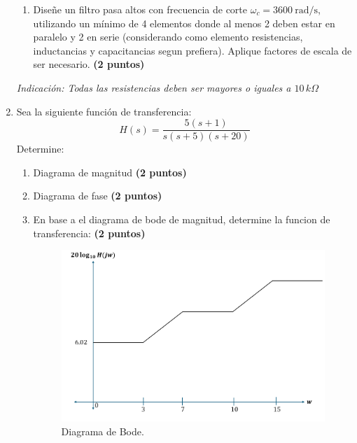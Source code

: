 \documentclass[
	spanish, %
	letterpaper, oneside
]{article}
\begin{document}
\begin{enumerate}
\begin{enumerate}[label=(\alph*)]
        \item Diseñe un filtro pasa altos con frecuencia de corte $\omega_c = 3600~\text{rad/s}$, utilizando un mínimo de 4 elementos donde al menos 2 deben estar en paralelo y 2 en serie (considerando como elemento resistencias, inductancias y capacitancias segun prefiera). Aplique factores de escala de ser necesario. \textbf{(2 puntos)}

    \end{enumerate}

    \textit{Indicación: Todas las resistencias deben ser mayores o iguales a $10\,k\Omega$}

    \item Sea la siguiente función de transferencia:
    \begin{equation}
        H(s) = \frac{5(s + 1)}{s(s + 5)(s + 20)}
    \end{equation}
    Determine:
    \begin{enumerate}[label=(\alph*)] 
        \item Diagrama de magnitud \textbf{(2 puntos)}
        \item Diagrama de fase \textbf{(2 puntos)}
        \item En base a el diagrama de bode de magnitud, determine la funcion de transferencia: \textbf{(2 puntos)}
    \begin{figure}
        \centering
        \includegraphics[width=0.7\linewidth]{img/Figura_5.png}
        \caption{Diagrama de Bode.}
        \label{fig:p4}
    \end{figure}
    \end{enumerate}
    \end{enumerate}
\end{document}
